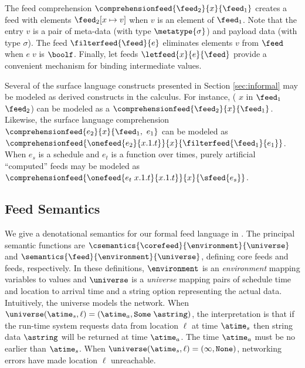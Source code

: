 The feed comprehension $\comprehensionfeed{\feed_2}{x}{\feed_1}$
creates a feed with elements $\feed_2[x \mapsto v]$ when $v$ is an
element of $\feed_1$. Note that the entry $v$ is a pair of meta-data
(with type $\metatype{\sigma}$) and payload data (with type $\sigma$).
The feed $\filterfeed{\feed}{e}$ eliminates elements $v$ from $\feed$ when
$e\; v$ is $\boolf$.  Finally, let feeds $\letfeed{x}{e}{\feed}$
provide a convenient mechanism for binding intermediate values. 

Several of the surface language constructs presented in Section \ref{sec:informal} may be modeled as derived constructs in the calculus.  For instance,
( $x$ in $\feed_1$  $\feed_2$) 
can be modeled as a  $\comprehensionfeed{\feed_2}{x}{\feed_1}$. 
Likewise, the surface language comprehension
$\comprehensionfeed{e_2}{x}{\feed_1,~ e_1}$ can be modeled as
$\comprehensionfeed{\onefeed{e_2}{x.1.t}}{x}{\filterfeed{\feed_1}{e_1}}$. 
When $e_s$ is a schedule and $e_t$ is a function over times, purely artificial 
``computed'' feeds may be modeled as 
$\comprehensionfeed{\onefeed{e_t\; x.1.t}{x.1.t}}{x}{\sfeed{e_s}}$.



\subsection{Feed Semantics}
We give a denotational semantics for our formal feed language in 
.  The principal semantic functions are
$\csemantics{\corefeed}{\environment}{\universe}$ and
$\semantics{\feed}{\environment}{\universe}$, defining core feeds and
feeds, respectively.  In these definitions,
$\environment$ is an {\em environment} mapping variables to values
and $\universe$ is a {\em universe} mapping pairs of
schedule time and location to arrival time and a string option
representing the actual data.
Intuitively, the universe models the network.
When $\universe (\atime_s, \ell) = (\atime_a, \mathtt{Some} \; \astring)$,
 the interpretation is that if the run-time system requests data
from location $\ell$ at time $\atime_s$ then string data $\astring$
will be returned at time $\atime_a$.  The time $\atime_a$ must be
no earlier than $\atime_s$.
When $\universe (\atime_s, \ell) = (\infty, \mathtt{None})$,
networking errors have made location $\ell$ unreachable.


